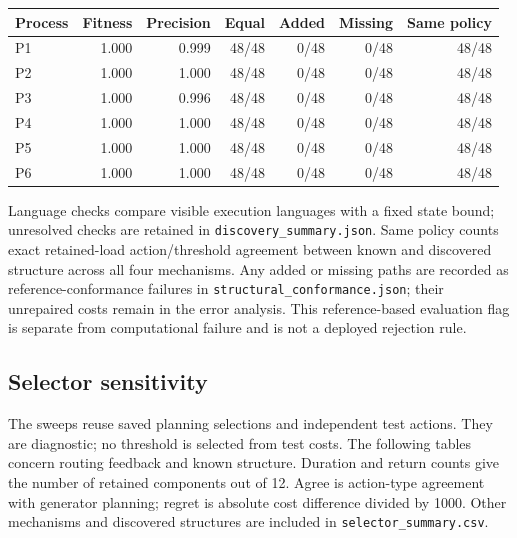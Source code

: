 \begin{center}\small\begin{tabular}{lrrrrrr}\toprule

Process & Fitness & Precision & Equal & Added & Missing & Same policy\\\midrule

P1 & 1.000 & 0.999 & 48/48 & 0/48 & 0/48 & 48/48\\

P2 & 1.000 & 1.000 & 48/48 & 0/48 & 0/48 & 48/48\\

P3 & 1.000 & 0.996 & 48/48 & 0/48 & 0/48 & 48/48\\

P4 & 1.000 & 1.000 & 48/48 & 0/48 & 0/48 & 48/48\\

P5 & 1.000 & 1.000 & 48/48 & 0/48 & 0/48 & 48/48\\

P6 & 1.000 & 1.000 & 48/48 & 0/48 & 0/48 & 48/48\\

\bottomrule\end{tabular}\end{center}

Language checks compare visible execution languages with a fixed state bound; unresolved checks are retained in \texttt{discovery\_summary.json}. Same policy counts exact retained-load action/threshold agreement between known and discovered structure across all four mechanisms. Any added or missing paths are recorded as reference-conformance failures in \texttt{structural\_conformance.json}; their unrepaired costs remain in the error analysis. This reference-based evaluation flag is separate from computational failure and is not a deployed rejection rule.

\subsection{Selector sensitivity}

The sweeps reuse saved planning selections and independent test actions. They are diagnostic; no threshold is selected from test costs. The following tables concern routing feedback and known structure. Duration and return counts give the number of retained components out of 12. Agree is action-type agreement with generator planning; regret is absolute cost difference divided by 1000. Other mechanisms and discovered structures are included in \texttt{selector\_summary.csv}.

